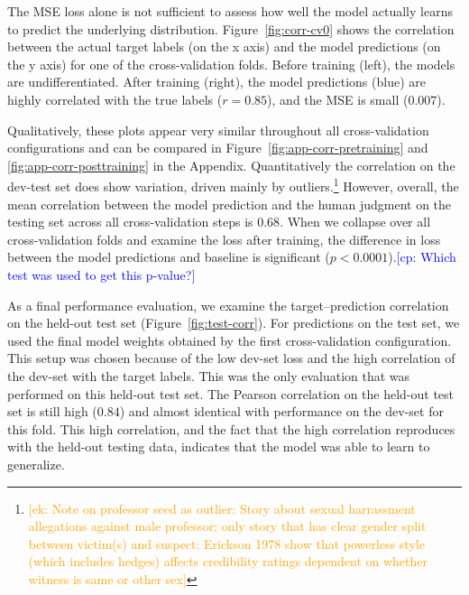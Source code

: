 \documentclass[11pt,a4paper]{article}
\newcommand{\ek}[1]{\textcolor{Orange}{[ek: #1]}}
\newcommand{\cp}[1]{\textcolor{Blue}{[cp: #1]}}
\begin{document}

The MSE loss alone is not sufficient to assess how well the model actually learns to predict the underlying distribution. Figure~\ref{fig:corr-cv0} shows the correlation between the actual target labels (on the x axis) and the model predictions (on the y axis) for one of the cross-validation folds. Before training (left), the models are undifferentiated. After training (right), the model predictions (blue) are highly correlated with the true labels ($r=0.85$), and the MSE is small ($0.007$).

Qualitatively, these plots appear very similar throughout all cross-validation configurations and can be compared in Figure~\ref{fig:app-corr-pretraining} and \ref{fig:app-corr-posttraining} in the Appendix. Quantitatively the correlation on the dev-test set does show variation, driven mainly by outliers.\footnote{\ek{Note on professor seed as outlier: Story about sexual harrassment allegations against male professor; only story that has clear gender split between victim(s) and suspect; Erickson 1978 show that powerless style (which includes hedges) affects credibility ratings dependent on whether witness is same or other sex}} However, overall, the mean correlation between the model prediction and the human judgment on the testing set across all cross-validation steps is $0.68$. When we collapse over all cross-validation folds and examine the loss after training, the difference in loss between the model predictions and baseline is significant ($p<0.0001$).\cp{Which test was used to get this p-value?}

As a final performance evaluation, we examine the target--prediction correlation on the held-out test set (Figure~\ref{fig:test-corr}). For predictions on the test set, we used the final model weights obtained by the first cross-validation configuration. This setup was chosen because of the low dev-set loss and the high correlation of the dev-set with the target labels. This was the only evaluation that was performed on this held-out test set. The Pearson correlation on the held-out test set is still high ($0.84$) and almost identical with performance on the dev-set for this fold. This high correlation, and the fact that the high correlation reproduces with the held-out testing data, indicates that the model was able to learn to generalize.
\end{document}
